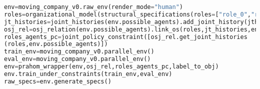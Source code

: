 \begin{lstlisting}[language=Python, caption={View of \emph{PRAHOM Wrapper} use for \emph{Moving Company}}, label={lst:wrapper_mc}]
env=moving_company_v0.raw_env(render_mode="human")
roles=organizational_model(structural_specifications(roles=["role_0","role_1""role2"],...)
jt_histories=joint_histories(env.possible_agents).add_joint_history(jth)
osj_rel=osj_relation(env.possible_agents).link_os(roles,jt_histories,env.possible_agents)
roles_agents_pc=joint_policy_constraint([osj_rel.get_joint_histories
(roles,env.possible_agents)])
train_env=moving_company_v0.parallel_env()
eval_env=moving_company_v0.parallel_env()
env=prahom_wrapper(env,osj_rel,roles_agents_pc,label_to_obj)
env.train_under_constraints(train_env,eval_env)
raw_specs=env.generate_specs()
\end{lstlisting}